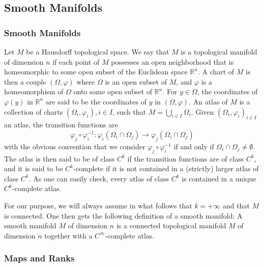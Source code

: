 \documentclass[12pt,hyperref,a4paper,UTF8]{ctexart}
\begin{document}
\subsection{Smooth Manifolds}

\subsubsection{Smooth Manifolds}
Let $M$ be a Hausdorff topological space. We say that $M$ is a topological manifold of dimension $n$ if each point of $M$ possesses an open neighborhood that is homeomorphic to some open subset of the Euclidean space $\mathbb{R}^n$. A chart of $M$ is then a couple $(\Omega, \varphi)$ where $\Omega$ is an open subset of $M$, and $\varphi$ is a homeomorphism of $\Omega$ onto some open subset of $\mathbb{R}^n$. For $y \in \Omega$, the coordinates of $\varphi(y)$ in $\mathbb{R}^n$ are said to be the coordinates of $y$ in $(\Omega, \varphi)$. An atlas of $M$ is a collection of charts $\left(\Omega_i, \varphi_i\right), i \in I$, such that $M=\bigcup_{i \in I} \Omega_i$. Given $\left(\Omega_i, \varphi_i\right)_{i \in I}$ an atlas, the transition functions are
$$
\varphi_j \circ \varphi_i^{-1}: \varphi_i\left(\Omega_i \cap \Omega_j\right) \rightarrow \varphi_j\left(\Omega_i \cap \Omega_j\right)
$$
with the obvious convention that we consider $\varphi_j \circ \varphi_i^{-1}$ if and only if $\Omega_i \cap \Omega_j \neq \emptyset$. The atlas is then said to be of class $C^k$ if the transition functions are of class $C^k$, and it is said to be $C^k$-complete if it is not contained in a (strictly) larger atlas of class $C^k$. As one can easily check, every atlas of class $C^k$ is contained in a unique $C^k$-complete atlas.

\vskip 3pt
For our purpose, we will always assume in what follows that $k=+\infty$ and that $M$ is connected. One then gets the following definition of a smooth manifold: A smooth manifold $M$ of dimension $n$ is a connected topological manifold $M$ of dimension $n$ together with a $C^{\infty}$-complete atlas.

\subsubsection{Maps and Ranks}
\end{document}
